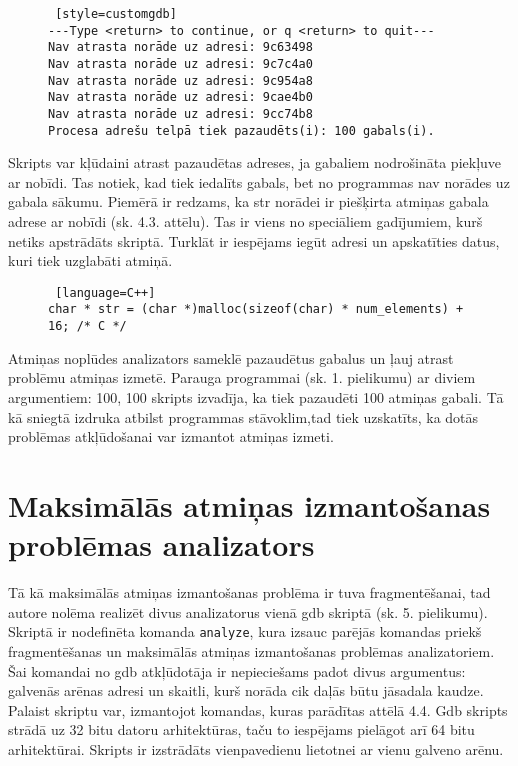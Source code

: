 \begin{figure}[h]
\begin{lstlisting} [style=customgdb]
---Type <return> to continue, or q <return> to quit---
Nav atrasta norāde uz adresi: 9c63498
Nav atrasta norāde uz adresi: 9c7c4a0
Nav atrasta norāde uz adresi: 9c954a8
Nav atrasta norāde uz adresi: 9cae4b0
Nav atrasta norāde uz adresi: 9cc74b8
Procesa adrešu telpā tiek pazaudēts(i): 100 gabals(i).
\end{lstlisting}
\caption{\textbf{\fontsize{11}{12}\selectfont {Atmiņas noplūdes atrašana, gdb skripta izvads}}}
\end{figure} %

Skripts var kļūdaini atrast pazaudētas adreses, ja gabaliem nodrošināta piekļuve ar nobīdi.
Tas notiek, kad tiek iedalīts gabals, bet no programmas nav norādes uz gabala sākumu.
Piemērā ir redzams, ka str norādei ir piešķirta atmiņas gabala adrese ar nobīdi (sk. 4.3. attēlu).
Tas ir viens no speciāliem gadījumiem, kurš netiks apstrādāts skriptā. 
Turklāt ir iespējams iegūt adresi un apskatīties datus, kuri tiek uzglabāti atmiņā.
\begin{figure}[h]
\begin{lstlisting} [language=C++]
char * str = (char *)malloc(sizeof(char) * num_elements) + 16; /* C */
\end{lstlisting}
\caption{\textbf{\fontsize{11}{12}\selectfont {Speciālgadījums, no procesa adrešu telpā nav norādes uz gabala sākumu}}}
\end{figure}

Atmiņas noplūdes analizators sameklē pazaudētus gabalus un ļauj atrast problēmu atmiņas izmetē.
Parauga programmai (sk. 1. pielikumu) ar diviem argumentiem: 100, 100 skripts izvadīja, ka tiek pazaudēti 100 atmiņas gabali.
Tā kā sniegtā izdruka atbilst programmas stāvoklim,tad tiek uzskatīts, ka dotās problēmas atkļūdošanai var izmantot atmiņas izmeti.

\section{Maksimālās atmiņas izmantošanas problēmas analizators}
Tā kā maksimālās atmiņas izmantošanas problēma ir tuva fragmentēšanai, tad autore nolēma realizēt divus analizatorus vienā gdb skriptā (sk. 5. pielikumu).
Skriptā ir nodefinēta komanda \texttt{analyze}, kura izsauc parējās komandas priekš fragmentēšanas un maksimālās atmiņas izmantošanas problēmas analizatoriem.
Šai komandai no gdb atkļūdotāja ir nepieciešams padot divus argumentus: galvenās arēnas adresi un skaitli, kurš norāda cik daļās būtu jāsadala kaudze.
Palaist skriptu var, izmantojot komandas, kuras parādītas attēlā 4.4.
Gdb skripts strādā uz 32 bitu datoru arhitektūras, taču to iespējams pielāgot arī 64 bitu arhitektūrai.
Skripts ir izstrādāts vienpavedienu lietotnei ar vienu galveno arēnu.

